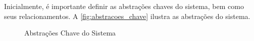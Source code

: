 Inicialmente, é importante definir as abstrações chaves do sistema, bem como seus relacionamentos. A \autoref{fig:abstracoes_chave} ilustra as abstrações do sistema.

\begin{figure}[H]
    \centering
    \caption{Abstrações Chave do Sistema}
    \label{fig:abstracoes_chave}
\end{figure}
